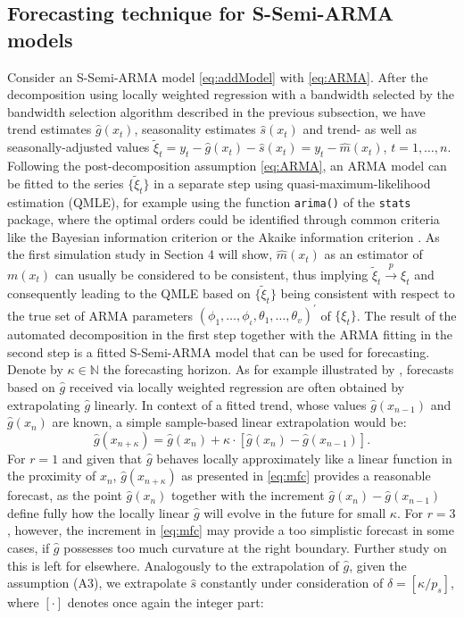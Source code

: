 \subsection{Forecasting technique for S-Semi-ARMA models}\label{sec:forecasting}

Consider an S-Semi-ARMA model \eqref{eq:addModel} with \eqref{eq:ARMA}. After the decomposition using locally weighted regression with a bandwidth selected by the bandwidth selection algorithm described in the previous subsection, we have trend estimates \(\hat g(x_t)\), seasonality estimates \(\hat s(x_t)\) and trend- as well as seasonally-adjusted values \(\tilde \xi_t = y_t - \hat g(x_t) - \hat s(x_t)=y_t-\hat m(x_t)\), \(t=1,\dots, n\). Following the post-decomposition assumption \eqref{eq:ARMA}, an ARMA model can be fitted to the series \(\{\tilde \xi_t\}\) in a separate step using quasi-maximum-likelihood estimation (QMLE), for example using the function \texttt{arima()} of the \texttt{stats} package, where the optimal orders could be identified through common criteria like the Bayesian information criterion \citep[BIC,][]{schwarz1978bic} or the Akaike information criterion \citep[AIC,][]{Akaike1974}. As the first simulation study in Section 4 will show, \(\hat m(x_t)\) as an estimator of \(m(x_t)\) can usually be considered to be consistent, thus implying \(\tilde \xi_t \overset{p}{\rightarrow}\xi_t\) and consequently leading to the QMLE based on \(\{\tilde\xi_t\}\) being consistent with respect to the true set of ARMA parameters \((\phi_1,\dots,\phi_{\iota},\theta_1,\dots,\theta_{v})^{'}\) of \(\{\xi_t\}\). The result of the automated decomposition in the first step together with the ARMA fitting in the second step is a fitted S-Semi-ARMA model that can be used for forecasting. Denote by \(\kappa \in \mathbb{N}\) the forecasting horizon. As for example illustrated by \citet{beran1999semifar}, forecasts based on \(\hat g\) received via locally weighted regression are often obtained by extrapolating \(\hat g\) linearly. In context of a fitted trend, whose values \(\hat g(x_{n-1})\) and \(\hat g(x_{n})\) are known, a simple sample-based linear extrapolation would be:
\begin{equation}
\hat g(x_{n+\kappa}) = \hat g(x_{n}) + \kappa \cdot \left[ \hat g(x_{n}) - \hat g(x_{n - 1}) \right].
\label{eq:mfc}
\end{equation}
For \(r=1\) and given that \(\hat g\) behaves locally approximately like a linear function in the proximity of \(x_n\), \(\hat g(x_{n+\kappa})\) as presented in \eqref{eq:mfc} provides a reasonable forecast, as the point \(\hat g(x_n)\) together with the increment \(\hat g(x_{n}) - \hat g(x_{n - 1})\) define fully how the locally linear \(\hat g\) will evolve in the future for small \(\kappa\). For \(r=3\), however, the increment in \eqref{eq:mfc} may provide a too simplistic forecast in some cases, if \(\hat g\) possesses too much curvature at the right boundary. Further study on this is left for elsewhere. Analogously to the extrapolation of \(\hat g\), given the assumption (A3), we extrapolate \(\hat s\) constantly under consideration of \(\delta = [\kappa / p_s]\), where \([\cdot]\) denotes once again the integer part:
